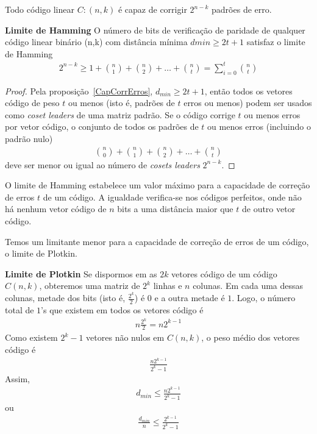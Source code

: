 \begin{theorem} Todo código linear $C:(n,k)$ é capaz de corrigir $2^{n-k}$ padrões de erro.
\end{theorem}

\begin{theorem} {\bf Limite de Hamming} \label{LimHamm}   O número de bits de verificação de paridade de qualquer código linear binário (n,k) com distância mínima $dmin \geq 2t + 1$ satisfaz o limite de Hamming
\begin{align*}
2^{n-k} \geq  1 + \binom {n}{1} + \binom {n}{2} + \ldots + \binom {n}{t}=\displaystyle\sum_{i=0}^{t} \binom {n}{t}
\end{align*}
\end{theorem}

\begin{proof}  Pela proposição~\ref{CapCorrErros}, $d_{min} \geq 2t + 1$, então todos os vetores código de peso $t$ ou menos (isto é, padrões de $t$ erros ou menos) podem ser usados como \emph{coset leaders} de uma matriz padrão. Se o código corrige $t$ ou menos erros por vetor código, o conjunto de todos os padrões de $t$ ou menos erros (incluindo o padrão nulo)
\begin{align*}
\binom{n}{0} + \binom {n}{1} + \binom {n}{2} + \ldots + \binom {n}{t}
\end{align*}
deve ser menor ou igual ao número de \emph{cosets leaders} $2^{n-k}$.
\end{proof}

O limite de Hamming estabelece um valor máximo para a capacidade de correção de erros $t$ de um código. A igualdade verifica-se nos códigos perfeitos, onde não há nenhum vetor código de $n$ bits a uma distância maior que $t$ de outro vetor código.

Temos um limitante menor para a capacidade de correção de erros de um código, o limite de Plotkin.

\begin{theorem} {\bf Limite de Plotkin} \label{LimPlot}  Se dispormos em as $2k$ vetores código de um código $C(n,k)$, obteremos uma matriz de $2^k$ linhas e $n$ colunas. Em cada uma dessas colunas, metade dos bits (isto é, $\frac{2^k}{2}$) é $0$ e a outra metade é $1$. Logo, o número total de $1$'s que existem em todos os vetores código é
\begin{align*}
n\frac{2^k}{2}=n2^{k-1}
\end{align*}
Como existem $2^k-1$ vetores não nulos em $C(n,k)$, o peso médio dos vetores código é
\begin{align*}
\frac{n2^{k-1}}{2^k-1}
\end{align*}
Assim,
\begin{align*}
d_{min} \leq \frac{n2^{k-1}}{2^k-1}
\end{align*}
ou
\begin{align*}
\frac{d_{min}}{n} \leq \frac{2^{k-1}}{2^k-1}
\end{align*}
\end{theorem}

